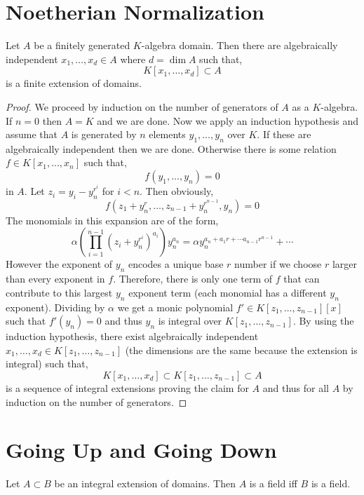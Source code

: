 \documentclass[12pt]{article}
\begin{document}
\section{Noetherian Normalization}

\begin{theorem}
Let $A$ be a finitely generated $K$-algebra domain. Then there are algebraically independent $x_1, \dots, x_d \in A$ where $d = \dim{A}$ such that,
\[ K[x_1, \dots, x_d] \subset A \]
is a finite extension of domains.
\end{theorem}

\begin{proof}
We proceed by induction on the number of generators of $A$ as a $K$-algebra. If $n = 0$ then $A = K$ and we are done. Now we apply an induction hypothesis and assume that $A$ is generated by $n$ elements $y_1, \dots, y_n$ over $K$. If these are algebraically independent then we are done. Otherwise there is some relation $f \in K[x_1, \dots, x_n]$ such that,
\[ f(y_1, \dots, y_n) = 0 \]
in $A$. Let $z_i = y_i - y_n^{r^i}$ for $i < n$. Then obviously,
\[ f(z_1 + y_n^r, \dots, z_{n-1} + y_n^{r^{n-1}}, y_n) = 0 \]
The monomials in this expansion are of the form,
\[ \alpha \left( \prod_{i = 1}^{n-1} (z_i + y_n^{r^i})^{a_i} \right) y_n^{a_n} = \alpha y^{a_n + a_1 r + \cdots a_{n-1} r^{n-1}}_n + \cdots \]
However the exponent of $y_n$ encodes a unique base $r$ number if we choose $r$ larger than every exponent in $f$. Therefore, there is only one term of $f$ that can contribute to this largest $y_n$ exponent term (each monomial has a different $y_n$ exponent). Dividing by $\alpha$ we get a monic polynomial $f' \in K[z_1, \dots, z_{n-1}][x]$ such that $f'(y_n) = 0$ and thus $y_n$ is integral over $K[z_1, \dots, z_{n-1}]$. By using the induction hypothesis, there exist algebraically independent $x_1, \dots, x_d \in K[z_1, \dots, z_{n-1}]$ (the dimensions are the same because the extension is integral) such that,
\[ K[x_1, \dots, x_d] \subset K[z_1, \dots, z_{n-1}] \subset A \]
is a sequence of integral extensions proving the claim for $A$ and thus for all $A$ by induction on the number of generators. 
\end{proof}

\section{Going Up and Going Down}

\begin{lemma}
Let $A \subset B$ be an integral extension of domains. Then $A$ is a field iff $B$ is a field.
\end{lemma}
\end{document}
